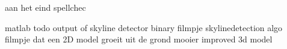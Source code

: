 


aan het eind
	spellchec

matlab todo
	output of skyline detector binary
	filmpje skylinedetection algo
	filmpje dat een 2D model groeit uit de grond
	mooier improved 3d model
